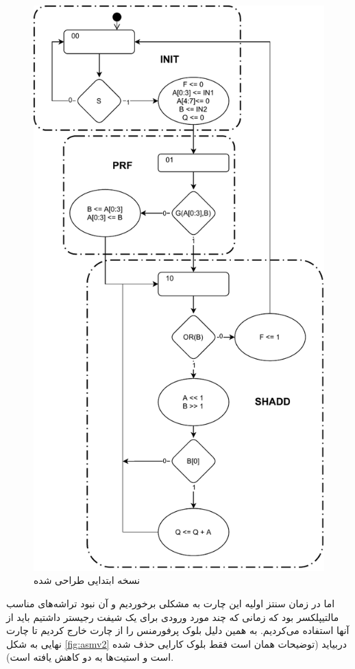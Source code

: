 \documentclass{article}
\begin{document}
\begin{figure}
	\centering
	\includegraphics[scale=0.5]{./graphics/asmv1}
	\caption{نسخه ابتدایی طراحی شده}
	\label{fig:asmv1}
\end{figure}


اما در زمان سنتز اولیه این چارت به مشکلی برخوردیم و آن نبود تراشه‌های مناسب مالتیپلکسر  بود که زمانی که چند مورد ورودی برای یک شیفت رجیستر داشتیم باید از آنها استفاده می‌کردیم. به همین دلیل بلوک پرفورمنس را از چارت خارج کردیم تا چارت نهایی به شکل \ref{fig:asmv2} دربیاید (توضیحات همان است فقط بلوک کارایی حذف شده است و استیت‌ها به دو کاهش یافته است).
\end{document}
